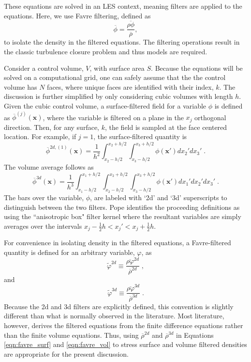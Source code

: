 These equations are solved in an LES context, meaning filters are
applied to the equations. Here, we use Favre filtering, defined as
\[
\overline{\phi}=\frac{\overline{\rho\phi}}{\overline{\rho}},\]
 to isolate the density in the filtered equations. The filtering operations
result in the classic turbulence closure problem and thus models are
required. 

Consider a control volume, $V$, with surface area $S$.  Because the equations will be  solved on a computational grid, one can safely assume that the the control volume has $N$ faces, where unique faces are identified with their index, $k$.  The discussion is further simplified by only considering cubic volumes with length $h$.  
Given the cubic control volume, a surface-filtered field for a variable $\phi$ is defined as $\overline{\phi}^{(j)}(\mathbf{x})$, where the variable is filtered on a plane in the $x_j$ orthogonal direction.  Then, for any surface, $k$, the field is sampled at the face centered location.  For example, if $j=1$, the surface-filtered quantity is
%
\begin{equation}
\overline{\phi}^{2d, (1)}(\mathbf x) = \frac{1}{h^2} \int_{x_2 - h/2}^{x_2 + h/2}  \int_{x_3 - h/2}^{x_3 + h/2} \phi(\mathbf x') dx_2' dx_3' \; .
\end{equation} 
%
The volume average follows as
%
\begin{equation}
\overline{\phi}^{3d} (\mathbf x) = \frac{1}{h^3} \int_{x_1 - h/2}^{x_1 + h/2} \int_{x_2 - h/2}^{x_2 + h/2}  \int_{x_3 - h/2}^{x_3 + h/2} \phi(\mathbf x') dx_1' dx_2' dx_3' \; .
\end{equation}
%
The bars over the variable, $\phi$, are labeled with `2d' and `3d' superscripts to distinguish between the two filters.  Pope \cite{Pope179} identifies the proceeding definitions as using the ``anisotropic box" filter kernel where the resultant variables are simply averages over the intervals $x_j - \frac{1}{2}h < x_j' < x_j + \frac{1}{2}h$. 

For convenience in isolating density in the filtered equations, a Favre-filtered quantity is defined for an arbitrary variable, $\varphi$, as 
%
\begin{equation}\label{eqn:favre_surf}
\widetilde{\varphi}^{2d} \equiv \frac{\overline{\rho \varphi}^{2d}}{\overline{\rho}^{2d}} \; ,
\end{equation}
%
and
%
\begin{equation}\label{eqn:favre_vol}
\widetilde{\varphi}^{3d} \equiv \frac{\overline{\rho \varphi}^{3d}}{\overline{\rho}^{3d}} \;.
\end{equation}
%
Because the 2d and 3d filters are explicitly defined, this convention is slightly different than what is normally observed in the literature.  Most literature, however, derives the filtered equations from the finite difference equations rather than the finite volume equations.  Thus, using $\overline{\rho}^{2d}$ and $\overline{\rho}^{3d}$ in Equations \ref{eqn:favre_surf} and \ref{eqn:favre_vol} to stress surface and volume filtered densities are appropriate for the present discussion.

